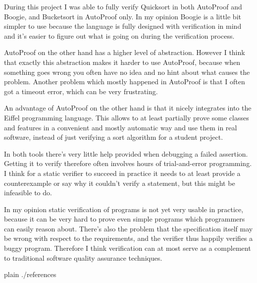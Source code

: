 \documentclass[a4paper,10pt]{article}
\begin{document}
During this project I was able to fully verify Quicksort in both AutoProof and Boogie, and Bucketsort in AutoProof only.
In my opinion Boogie is a little bit simpler to use because the language is fully designed with verification in mind
and it's easier to figure out what is going on during the verification process.

AutoProof on the other hand has a higher level of abstraction.
However I think that exactly this abstraction makes it harder to use AutoProof, 
because when something goes wrong you often have no idea and no hint about what causes the problem.
Another problem which mostly happened in AutoProof is that I often got a timeout error, which can be very frustrating.

An advantage of AutoProof on the other hand is that it nicely integrates into the Eiffel programming language.
This allows to at least partially prove some classes and features in a convenient and mostly automatic way
and use them in real software, instead of just verifying a sort algorithm for a student project.

In both tools there's very little help provided when debugging a failed assertion.
Getting it to verify therefore often involves hours of trial-and-error programming.
I think for a static verifier to succeed in practice it needs to at least provide a counterexample 
or say why it couldn't verify a statement, but this might be infeasible to do.

In my opinion static verification of programs is not yet very usable in practice,
because it can be very hard to prove even simple programs which programmers can easily reason about.
There's also the problem that the specification itself may be wrong with respect to the requirements, 
and the verifier thus happily verifies a buggy program.
Therefore I think verification can at most serve as a complement to traditional software quality assurance techniques.

\begin{flushleft}
{{{
 {plain}
 {./references}
}}}
\end{flushleft}


\todos
\end{document}
